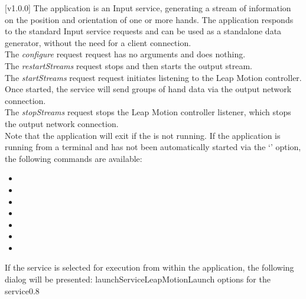 [v1.0.0]
The  application is an Input service,
generating a stream of information on the position and orientation of one or more hands.
The application responds to the standard Input service requests and can be used as a
standalone data generator, without the need for a client connection.\\

The \emph{configure} request request has no arguments and does nothing.\\

The \emph{restartStreams} request stops and then starts the output stream.\\

The \emph{startStreams} request request initiates listening to the Leap Motion controller.
Once started, the service will send groups of hand data via the output \yarp{} network
connection.\\

The \emph{stopStreams} request stops the Leap Motion controller listener, which stops the
output \yarp{} network connection.\\ 

Note that the application will exit if the \emph{\RS} is not running.
\insertAppParameters
\insertTagDescription{\LMI}
\insertInputServiceComment
\condPage{}
If the application is running from a terminal and has not been automatically started via
the `' option, the following commands are available:
\begin{itemize}
\item{}
\item\exSp{}
\item\exSp{}
\item\exSp{}
\item\exSp{}
\item\exSp{}
\item\exSp{}
\end{itemize}
\secondaryEnd
\condPage
{}
If the service is selected for execution from within the \emph{\CMU} application, the
following dialog will be presented:
%
{launchServiceLeapMotion}{Launch options for the \emph{\LMI} service}{0.8}

